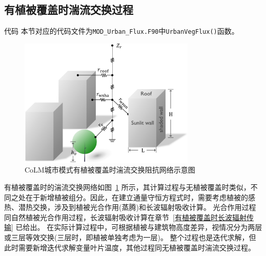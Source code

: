 \subsection{有植被覆盖时湍流交换过程}
\begin{mymdframed}{代码}
本节对应的代码文件为\texttt{MOD\_Urban\_Flux.F90}中\texttt{UrbanVegFlux()}函数。
\end{mymdframed}

{
\begin{figure}[htbp]
\centering
\includegraphics[width=0.75\textwidth]{Figures/城市模式/CoLM城市模式包含植被湍流交换阻抗网络.png}
\caption{CoLM城市模式有植被覆盖时湍流交换阻抗网络示意图}
\label{fig:有植被覆盖时城市湍流交换阻抗示意图}
\end{figure}
}
有植被覆盖时的湍流交换网络如图~\ref{fig:有植被覆盖时城市湍流交换阻抗示意图} 所示，其计算过程与无植被覆盖时类似，不同之处在于新增植被组分。因此，在建立通量守恒方程式时，需要考虑植被的感热、潜热交换，涉及到植被光合作用(蒸腾)和长波辐射吸收计算。
光合作用过程同自然植被光合作用过程，长波辐射吸收计算在章节~\ref{有植被覆盖时长波辐射传输} 已给出。
在实际计算过程中，可根据植被与建筑物高度差异，视情况分为两层或三层等效交换(三层时，即植被单独考虑为一层)。
整个过程也是迭代求解，但此时需要新增迭代求解变量叶片温度，其他过程同无植被覆盖时湍流交换过程。

